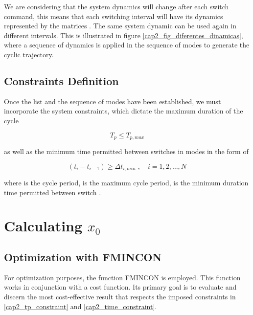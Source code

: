     We are considering that the system dynamics will change after each switch command, this means that each 
    switching interval will have its dynamics represented by the matrices . The same system 
    dynamic can be used again in different intervals. This is illustrated in figure \ref{cap2_fig_diferentes_dinamicas},
    where a sequence of dynamics is applied in the sequence of modes \highlight{$\big[4,2,1,2,3\big]$} to generate the cyclic trajectory.

\subsection{Constraints Definition}

    Once the list and the sequence of modes have been established, we must incorporate 
    the system constraints, which dictate the maximum duration of the cycle
    
    \noindent
    \begin{equation}
        \label{cap2_tp_constraint}
        T_p \le T_{p,max}
    \end{equation}
    
    \noindent
    as well as the minimum time permitted between switches in modes in the form of

    \noindent
    \begin{equation}
        \label{cap2_time_constraint}
        (t_i - t_{i - 1}) \ge \Delta t_{i,min}\;, \quad i = 1,2,\dotso,N
    \end{equation}

    \noindent
    where  is the cycle period,  is the maximum cycle period,
     is the minimum duration time permitted between switch .

\section{Calculating \texorpdfstring{$x_0$}{x\_0}}

    

\subsection{Optimization with FMINCON}

    For optimization purposes, the function FMINCON is employed. This function works 
    in conjunction with a cost function. Its primary goal is to evaluate and 
    discern the most cost-effective result that respects the imposed constraints in \eqref{cap2_tp_constraint} and 
    \eqref{cap2_time_constraint}.
    
